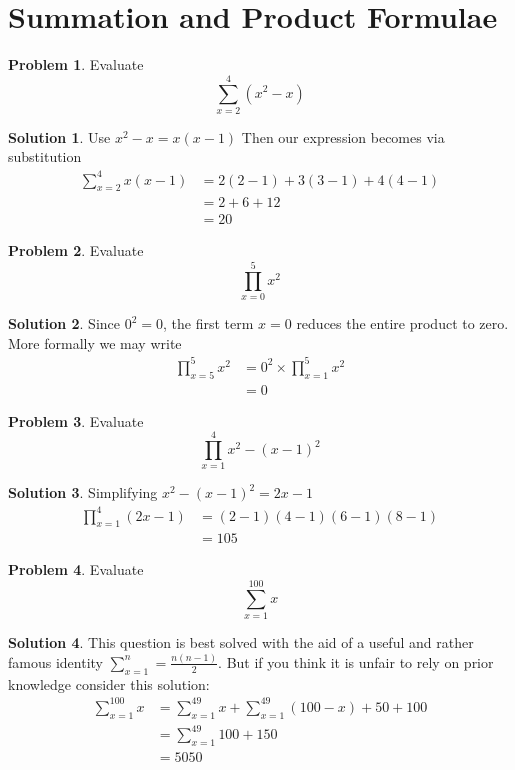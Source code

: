 \documentclass[a4paper]{article}
\theoremstyle{definition}
\newtheorem{problem}{Problem}[section]
\newtheorem*{solution}{Solution}
\begin{document}
\newpage
\section{Summation and Product Formulae}
\begin{problem}
Evaluate
\[
\sum_{x=2}^4 (x^2-x)
\]
\end{problem}
\begin{solution}
Use \(x^2 -x = x(x-1)\)
Then our expression becomes via substitution
\begin{align*}
\sum_{x=2}^4 x(x-1) &= 2(2-1) + 3(3-1) + 4(4-1) \\
&= 2 + 6 + 12 \\
&=20
\end{align*}
\end{solution}

\begin{problem}
Evaluate
\[
\prod_{x=0}^5 x^2
\]
\end{problem}
\begin{solution}
Since \(0^2 = 0\), the first term \(x = 0\) reduces the entire product to zero. More formally we may write
\begin{align*}
\prod_{x=5}^5 x^2 &= 0^2 \times \prod_{x=1}^5x^2 \\ 
&= 0
\end{align*}
\end{solution}

\begin{problem}
Evaluate
\[
\prod_{x=1}^{4}x^2-(x-1)^2
\]
\end{problem}
\begin{solution}
Simplifying \(x^2 - (x-1)^2 = 2x -1\)
\begin{align*}
\prod_{x=1}^4 (2x-1) &= (2-1)(4-1)(6-1)(8-1) \\
&=105
\end{align*}
\end{solution}

\begin{problem}
Evaluate
\[
\sum_{x=1}^{100} x
\]
\end{problem}
\begin{solution}
This question is best solved with the aid of a useful and rather famous identity \(\sum_{x=1}^n = \frac{n(n-1)}{2}\). But if you think it is unfair to rely on prior knowledge consider this solution:
\begin{align*}
\sum_{x=1}^{100}x &= \sum_{x=1}^{49}x + \sum_{x=1}^{49}(100-x) + 50 + 100 \\
&= \sum_{x=1}^{49}100 + 150 \\
&= 5050
\end{align*}
\end{solution}
\end{document}
